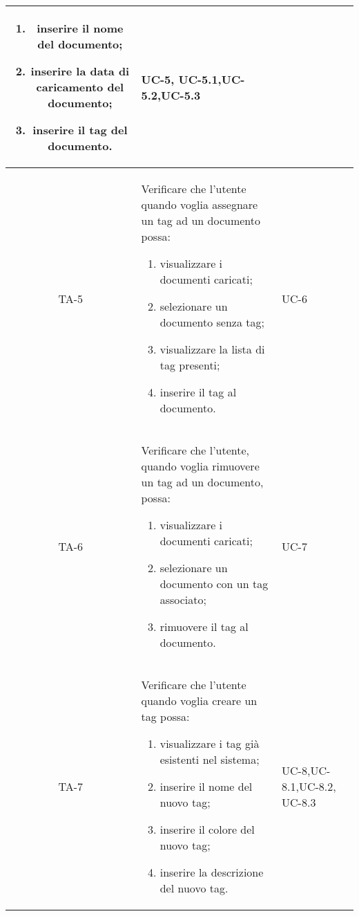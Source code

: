 \begin{xltabular}{\textwidth}{| c | X | X | c |}
\begin{enumerate}
        \item inserire il nome del documento;
        \item inserire la data di caricamento del documento;
        \item inserire il tag del documento.
    \end{enumerate}& UC-5, \newline UC-5.1,\newline UC-5.2,\newline UC-5.3 & \textcolor{xmarkcolor}{}  \\
    \hline
     TA-5 & Verificare che l’utente quando voglia assegnare un tag ad un documento possa:
    \begin{enumerate}
        \item visualizzare i documenti caricati;
        \item selezionare un documento senza tag;
        \item visualizzare la lista di tag presenti;
        \item inserire il tag al documento.
    \end{enumerate}& UC-6 & \textcolor{xmarkcolor}{}  \\
    \hline
    TA-6 & Verificare che l’utente, quando voglia rimuovere un tag ad un documento, possa:
    \begin{enumerate}
        \item visualizzare i documenti caricati;
        \item selezionare un documento con un tag associato;
        \item rimuovere il tag al documento.
    \end{enumerate}& UC-7 & \textcolor{xmarkcolor}{}  \\
    \hline
     TA-7 & Verificare che l’utente quando voglia creare un tag possa:
    \begin{enumerate}
        \item visualizzare i tag già esistenti nel sistema;
        \item inserire il nome del nuovo tag;
        \item inserire il colore del nuovo tag;
        \item inserire la descrizione del nuovo tag.
    \end{enumerate}& UC-8,\newline UC-8.1,\newline UC-8.2, \newline UC-8.3 & \textcolor{xmarkcolor}{} \\

\end{xltabular}
